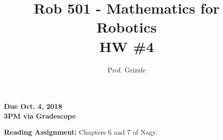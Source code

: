 \documentclass[letterpaper]{article}
\author{Prof. Grizzle}
\title{Rob 501 - Mathematics for Robotics\\
HW \#4}
\begin{document}
\date{}
\maketitle


 \newcommand{\trace}{\mathrm{trace}}
\newcommand{\real}{\mathbb R}  %
\newcommand{\nat}{\mathbb N}   %
\newcommand{\cp}{\mathbb C}    %
\newcommand{\ds}{\displaystyle}
\newcommand{\mf}[2]{\frac{\ds #1}{\ds #2}}
\newcommand{\Nagy}[2]{{Nagy, Page~#1, }{Prob.~#2}}
\newcommand{\spanof}[1]{\textrm{span} \{ #1 \}}
\parindent 0pt


\begin{flushright}
{\bfseries Due Oct. 4, 2018} \\
{\bfseries 3PM via Gradescope} \\[3mm]
\end{flushright}

\noindent \textbf{Reading Assignment:}  Chapters 6 and 7 of Nagy.
\end{document}
